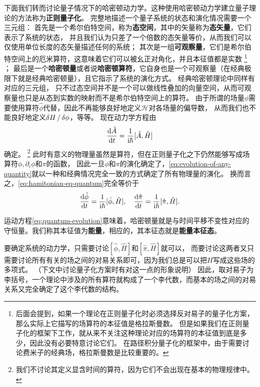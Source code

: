 \documentclass[UTF8, a4paper]{ctexart}
\newcommand*{\ii}{\mathrm{i}}
\begin{document}
下面我们转而讨论量子情况下的哈密顿动力学。这种使用哈密顿动力学建立量子理论的方法称为\textbf{正则量子化}。
完整地描述一个量子系统的状态和演化情况需要一个三元组：
首先是一个希尔伯特空间，称为\textbf{态空间}，其中的矢量称为\textbf{态矢量}，它们表示了系统的状态，
并且我们认为只差了一个倍数的态矢量等价，从而我们可以仅使用单位长度的态矢量描述任何的系统；
其次是一组\textbf{可观察量}，它们是希尔伯特空间上的厄米算符，这意味着它们可以被幺正对角化，并且本征值都是实数%
\footnote{后面会提到，如果一个理论在正则量子化时必须选择反对易子的量子化方案，那么实际上它描写的场算符的本征值是格拉斯曼数。
但是如果我们在正则量子化的框架下工作，就从来不关注这种理论对应的场算符的本征值到底是多少，因此没有必要特意讨论它们。
在路径积分量子化的框架中，由于需要讨论费米子的经典场，格拉斯曼数是比较重要的。}%
；
最后是一个\textbf{哈密顿量}或者说\textbf{哈密顿算符}，它自身也是一个可观察量（在经典极限下就是经典哈密顿量），且它指示了系统的演化方式。
经典哈密顿理论中同样有对应的三元组，
只不过态空间并不是一个可以做线性叠加的向量空间，从而可观察量也只是从态到实数的映射而不是希尔伯特空间上的算符。
由于所谓的场量$\phi$需要使用算符$\hat{\phi}$代替，因此不再能够良好地定义$\mathcal{H}$对各场量的偏导数，
从而我们也不能良好地定义$\var{H}/\var{\phi}$，等等。
现在动力学方程由
\begin{equation}
    \dv{\hat{A}}{t} = \frac{1}{\ii \hbar} [\hat{A}, \hat{H}]
    \label{eq:quantum-evolution}
\end{equation}
确定。%
\footnote{我们不讨论其定义显含时间的算符，因为它们不会出现在基本的物理规律中。}%
此时有意义的物理量虽然是算符，但在正则量子化之下仍然能够写成场算符$\phi, \partial_i \phi$和$\pi$的函数，
因此一旦$\phi$和$\pi$的演化确定了，\eqref{eq:evolution-of-any-quantity}就以一种和经典情况完全一致的方式确定了所有物理量的演化。
换而言之，\eqref{eq:hamitonian-eq-quantum}完全等价于
\begin{equation}
    \dv{\hat{\phi}}{t} = \frac{1}{\ii \hbar} [\hat{\phi}, \hat{H}], 
    \quad \dv{\hat{\pi}}{t} = \frac{1}{\ii \hbar} [\hat{\pi}, \hat{H}].
    \label{eq:hamitonian-eq-quantum}
\end{equation}

运动方程\eqref{eq:quantum-evolution}意味着，哈密顿量就是与时间平移不变性对应的守恒量。我们称其本征值为\textbf{能量}，相应的，其本征态就是\textbf{能量本征态}。

要确定系统的动力学，只需要讨论$[\hat{\phi}, \hat{H}]$和$[\hat{\pi}, \hat{H}]$就可以，
而要讨论这两者又只需要讨论所有有关的场之间的对易关系即可，因为我们总是可以把$H$写成这些场的多项式。
（下文中讨论量子化方案时有对这一点的形象说明）
因此，取对易子为李括号，一个理论中涉及的所有算符就构成了一个李代数，而基本的场之间的对易关系又完全确定了这个李代数的结构。
\end{document}
